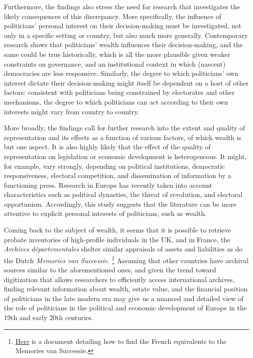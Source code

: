 Furthermore, the findings also stress the need for research that investigates the likely consequences of this discrepancy. More specifically, the influence of politicians' personal interest on their decision-making must be investigated, not only in a specific setting or country, but also much more generally. Contemporary research shows that politicians' wealth influences their decision-making, and the same could be true historically, which is all the more plausible given weaker constraints on governance, and an institutional context in which (nascent) democracies are less responsive. \autocite{tahoun2019personal} Similarly, the  degree to which politicians' own interest dictate their decision-making might itself be dependent on a host of other factors: consistent with politicians being constrained by electorates and other mechanisms, the degree to which politicians can act according to their own interests might vary from country to country. \autocite{djankov2010disclosure}

More broadly, the findings call for further research into the extent and quality of representation and its effects as a function of various factors, of which wealth is but one aspect. It is also highly likely that the effect of the quality of representation on legislation or economic development is heterogeneous. It might, for example, vary strongly, depending on political institutions, democratic responsiveness, electoral competition, and dissemination of information by a functioning press. Research in Europe has recently taken into account characteristics such as political dynasties, the threat of revolution, and electoral opportunism. \autocite{aidt2014workers, oosterlinck2020positive, aidt2019motivates} Accordingly, this study suggests that the literature can be more attentive to explicit personal interests of politicians, such as wealth. 

Coming back to the subject of wealth, it seems that it is possible to retrieve probate inventories of high-profile individuals in the UK, and in France, the \textit{Archives départementales} shelter similar appraisals of assets and liabilities as do the Dutch \textit{Memories van Successie}. \autocite{bottomley2019returns} \footnote{\href{https://archives.cd08.fr/arkotheque/client/ad_ardennes/_depot_arko/articles/1834/tables-des-successions-et-absences-_doc.pdf}{Here} is a document detailing how to find the French equivalents to the Memories van Successie.} Assuming that other countries have archival sources similar to the aforementioned ones, and given the trend toward digitization that allows researchers to efficiently access international archives, finding relevant information about wealth, estate value, and the financial position of politicians in the late modern era may give us a nuanced and detailed view of the role of politicians in the political and economic development of Europe in the 19th and early 20th centuries. 

%
%
\clearpage
\printbibliography

